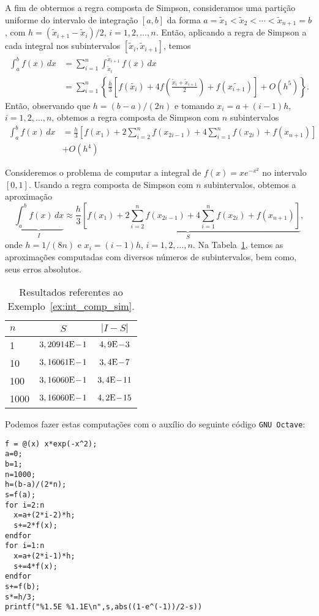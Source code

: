A fim de obtermos a regra composta de Simpson, consideramos uma partição uniforme do intervalo de integração $[a, b]$ da forma $a=\tilde{x}_1 < \tilde{x}_2 < \cdots < \tilde{x}_{n+1}=b$, com $h=(\tilde{x}_{i+1}-\tilde{x}_{i})/2$, $i=1, 2, \dotsc, n$. Então, aplicando a regra de Simpson a cada integral nos subintervalos $[\tilde{x}_i, \tilde{x}_{i+1}]$, temos
\begin{align}
  \int_a^b f(x)\,dx &= \sum_{i=1}^{n}\int_{\tilde{x}_i}^{\tilde{x}_{i+1}}f(x)\,dx\\
  &= \sum_{i=1}^n \left\{\frac{h}{3}\left[f(\tilde{x_i}) + 4f\left(\frac{\tilde{x}_i+\tilde{x}_{i+1}}{2}\right) + f(\tilde{x_{i+1}})\right] + O(h^5)\right\}.
\end{align}
Então, observando que $h=(b-a)/(2n)$ e tomando $x_i=a+(i-1)h$, $i=1, 2, \dotsc, n$, obtemos a regra composta de Simpson com $n$ subintervalos
\begin{align}
  \int_a^b f(x)\,dx &= \frac{h}{3}\left[f(x_1) + 2\sum_{i=2}^{n} f(x_{2i-1}) + 4\sum_{i=1}^{n} f(x_{2i}) + f(x_{n+1})\right] \nonumber\\
  &+ O(h^4)
\end{align}

\begin{ex}\label{ex:int_comp_sim}
  Consideremos o problema de computar a integral de $f(x)=xe^{-x^2}$ no intervalo $[0, 1]$. Usando a regra composta de Simpson com $n$ subintervalos, obtemos a aproximação
  \begin{equation}
    \underbrace{\int_a^b f(x)\,dx}_{I} \approx \underbrace{\frac{h}{3}\left[f(x_1) + 2\sum_{i=2}^{n} f(x_{2i-1}) + 4\sum_{i=1}^{n} f(x_{2i}) + f(x_{n+1})\right]}_{S},
  \end{equation}
onde $h=1/(8n)$ e $x_i = (i-1)h$, $i=1, 2, \dotsc, n$. Na Tabela~\ref{tab:ex_int_comp_sim}, temos as aproximações computadas com diversos números de subintervalos, bem como, seus erros absolutos.

\begin{table}[h!]
  \centering
  \caption{Resultados referentes ao Exemplo~\ref{ex:int_comp_sim}.}
  \begin{tabular}{l|cc}
    $n$ & $S$ & $|I-S|$ \\\hline
    1   & $3,20914\mathrm{E}\!-\!1$ & $4,9\mathrm{E}\!-\!3$ \\
    10  & $3,16061\mathrm{E}\!-\!1$ & $3,4\mathrm{E}\!-\!7$ \\
    100 & $3,16060\mathrm{E}\!-\!1$ & $3,4\mathrm{E}\!-\!11$ \\
    1000& $3,16060\mathrm{E}\!-\!1$ & $4,2\mathrm{E}\!-\!15$ \\\hline
  \end{tabular}
  \label{tab:ex_int_comp_sim}
\end{table}

\ifisoctave
Podemos fazer estas computações com o auxílio do seguinte código \verb+GNU Octave+:
\begin{verbatim}
f = @(x) x*exp(-x^2);
a=0;
b=1;
n=1000;
h=(b-a)/(2*n);
s=f(a);
for i=2:n
  x=a+(2*i-2)*h;
  s+=2*f(x);
endfor
for i=1:n
  x=a+(2*i-1)*h;
  s+=4*f(x);
endfor
s+=f(b);
s*=h/3;
printf("%1.5E %1.1E\n",s,abs((1-e^(-1))/2-s))
\end{verbatim}
\fi
\end{ex}

